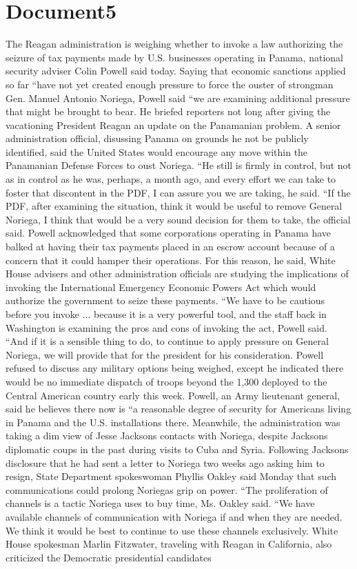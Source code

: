 \documentclass{article}
\begin{document}
\color[rgb]{0,0,0}\section{Document5}
\color[rgb]{0.4823529411764706,0.26666666666666666,0.09803921568627451}The Reagan administration is weighing whether to invoke a law authorizing the seizure of tax payments made by U.S. businesses operating in Panama, national security adviser Colin Powell said today. Saying that economic sanctions applied so far ``have not yet created enough pressure to force the ouster of strongman Gen. Manuel Antonio Noriega, Powell said ``we are examining additional pressure that might be brought to bear. He briefed reporters not long after giving the vacationing President Reagan an update on the Panamanian problem. A senior administration official, disussing Panama on grounds he not be publicly identified, said the United States would encourage any move within the Panamanian Defense Forces to oust Noriega. ``He still is firmly in control, but not as in control as he was, perhaps, a month ago, and every effort we can take to foster that discontent in the PDF, I can assure you we are taking, he said. ``If the PDF, after examining the situation, think it would be useful to remove General Noriega, I think that would be a very sound decision for them to take, the official said. Powell acknowledged that some corporations operating in Panama have balked at having their tax payments placed in an escrow account because of a concern that it could hamper their operations. For this reason, he said, White House advisers and other administration officials are studying the implications of invoking the International Emergency Economic Powers Act  which would authorize the government to seize these payments. ``We have to be cautious before you invoke ... because it is a very powerful tool, and the staff back in Washington is examining the pros and cons of invoking the act, Powell said. ``And if it is a sensible thing to do, to continue to apply pressure on General Noriega, we will provide that for the president for his consideration. Powell refused to discuss any military options being weighed, except he indicated there would be no immediate dispatch of troops beyond the 1,300 deployed to the Central American country early this week. Powell, an Army lieutenant general, said he believes there now is ``a reasonable degree of security for Americans living in Panama and the U.S. installations there. Meanwhile, the administration was taking a dim view of Jesse Jacksons contacts with Noriega, despite Jacksons diplomatic coups in the past during visits to Cuba and Syria. Following Jacksons disclosure that he had sent a letter to Noriega two weeks ago asking him to resign, State Department spokeswoman Phyllis Oakley said Monday that such communications could prolong Noriegas grip on power. ``The proliferation of channels is a tactic Noriega uses to buy time, Ms. Oakley said. ``We have available channels of communication with Noriega if and when they are needed. We think it would be best to continue to use these channels exclusively. White House spokesman Marlin Fitzwater, traveling with Reagan in California, also criticized the Democratic presidential candidates 
\end{document}
